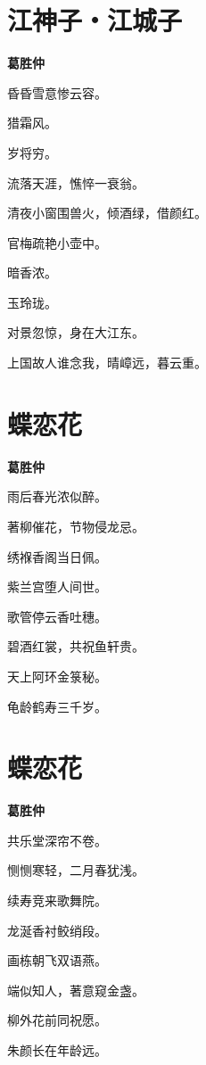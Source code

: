 \documentclass[12pt,a4paper]{ctexbook}
\begin{document}
\section{江神子・江城子}
\textbf{葛胜仲}\par\vspace{0.5em}
昏昏雪意惨云容。\par
猎霜风。\par
岁将穷。\par
流落天涯，憔悴一衰翁。\par
清夜小窗围兽火，倾酒绿，借颜红。\par
官梅疏艳小壶中。\par
暗香浓。\par
玉玲珑。\par
对景忽惊，身在大江东。\par
上国故人谁念我，晴嶂远，暮云重。\par

\section{蝶恋花}
\textbf{葛胜仲}\par\vspace{0.5em}
雨后春光浓似醉。\par
著柳催花，节物侵龙忌。\par
绣褓香阁当日佩。\par
紫兰宫堕人间世。\par
歌管停云香吐穗。\par
碧酒红裳，共祝鱼轩贵。\par
天上阿环金箓秘。\par
龟龄鹤寿三千岁。\par

\section{蝶恋花}
\textbf{葛胜仲}\par\vspace{0.5em}
共乐堂深帘不卷。\par
恻恻寒轻，二月春犹浅。\par
续寿竞来歌舞院。\par
龙涎香衬鲛绡段。\par
画栋朝飞双语燕。\par
端似知人，著意窥金盏。\par
柳外花前同祝愿。\par
朱颜长在年龄远。\par
\end{document}

